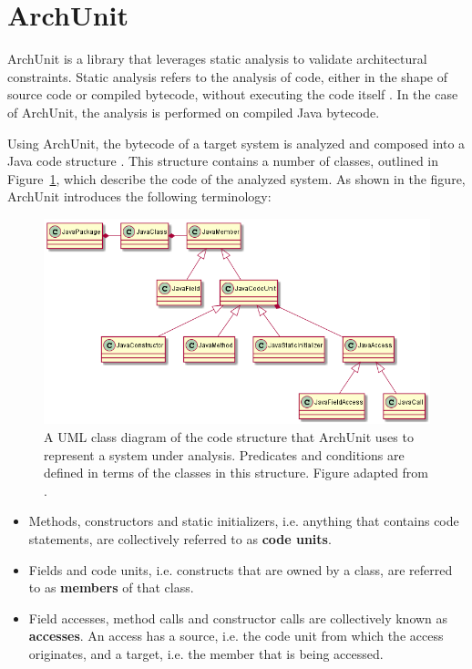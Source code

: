 \section{ArchUnit}\label{archunit-back-section}
ArchUnit is a library that leverages static analysis to validate architectural constraints. Static analysis refers to the analysis of code, either in the shape of source code or compiled bytecode, without executing the code itself \cite[p. 21]{chess_secure_2007}. In the case of ArchUnit, the analysis is performed on compiled Java bytecode.

Using ArchUnit, the bytecode of a target system is analyzed and composed into a Java code structure \cite{gafert_archunit_2020}. This structure contains a number of classes, outlined in Figure~\ref{fig:archunit}, which describe the code of the analyzed system. As shown in the figure, ArchUnit introduces the following terminology:

\begin{figure}
    \centering
    \captionsetup{justification=centering}
    \includegraphics[width=\textwidth]{figure/ArchUnit.png}
    \caption{A UML class diagram of the code structure that ArchUnit uses to represent a system under analysis. Predicates and conditions are defined in terms of the classes in this structure. Figure adapted from \cite{gafert_archunit_2020}.}
    \label{fig:archunit}
\end{figure}

\begin{itemize}
    \item Methods, constructors and static initializers, i.e. anything that contains code statements, are collectively referred to as \textbf{code units}.
    \item Fields and code units, i.e. constructs that are owned by a class, are referred to as \textbf{members} of that class.
    \item Field accesses, method calls and constructor calls are collectively known as \textbf{accesses}. An access has a source, i.e. the code unit from which the access originates, and a target, i.e. the member that is being accessed.
\end{itemize}

